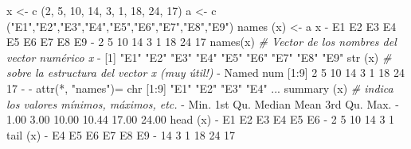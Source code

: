 \documentclass[
]{book}
\newenvironment{Shaded}{\begin{snugshade}}{\end{snugshade}}
\newcommand{\CommentTok}[1]{\textcolor[rgb]{0.56,0.35,0.01}{\textit{#1}}}
\newcommand{\DecValTok}[1]{\textcolor[rgb]{0.00,0.00,0.81}{#1}}
\newcommand{\FloatTok}[1]{\textcolor[rgb]{0.00,0.00,0.81}{#1}}
\newcommand{\FunctionTok}[1]{\textcolor[rgb]{0.00,0.00,0.00}{#1}}
\newcommand{\NormalTok}[1]{#1}
\newcommand{\OtherTok}[1]{\textcolor[rgb]{0.56,0.35,0.01}{#1}}
\newcommand{\SpecialCharTok}[1]{\textcolor[rgb]{0.00,0.00,0.00}{#1}}
\newcommand{\StringTok}[1]{\textcolor[rgb]{0.31,0.60,0.02}{#1}}
\begin{document}
\begin{Shaded}
\begin{Highlighting}[]
\NormalTok{x }\OtherTok{\textless{}{-}} \FunctionTok{c}\NormalTok{ (}\DecValTok{2}\NormalTok{, }\DecValTok{5}\NormalTok{, }\DecValTok{10}\NormalTok{, }\DecValTok{14}\NormalTok{, }\DecValTok{3}\NormalTok{, }\DecValTok{1}\NormalTok{, }\DecValTok{18}\NormalTok{, }\DecValTok{24}\NormalTok{, }\DecValTok{17}\NormalTok{)}
\NormalTok{a }\OtherTok{\textless{}{-}} \FunctionTok{c}\NormalTok{ (}\StringTok{"E1"}\NormalTok{,}\StringTok{"E2"}\NormalTok{,}\StringTok{"E3"}\NormalTok{,}\StringTok{"E4"}\NormalTok{,}\StringTok{"E5"}\NormalTok{,}\StringTok{"E6"}\NormalTok{,}\StringTok{"E7"}\NormalTok{,}\StringTok{"E8"}\NormalTok{,}\StringTok{"E9"}\NormalTok{)}
\FunctionTok{names}\NormalTok{ (x) }\OtherTok{\textless{}{-}}\NormalTok{ a}
\NormalTok{x}
\SpecialCharTok{{-}}\NormalTok{ E1 E2 E3 E4 E5 E6 E7 E8 E9 }
\SpecialCharTok{{-}}  \DecValTok{2}  \DecValTok{5} \DecValTok{10} \DecValTok{14}  \DecValTok{3}  \DecValTok{1} \DecValTok{18} \DecValTok{24} \DecValTok{17}
\FunctionTok{names}\NormalTok{(x) }\CommentTok{\# Vector de los nombres del vector numérico x }
\SpecialCharTok{{-}}\NormalTok{ [}\DecValTok{1}\NormalTok{] }\StringTok{"E1"} \StringTok{"E2"} \StringTok{"E3"} \StringTok{"E4"} \StringTok{"E5"} \StringTok{"E6"} \StringTok{"E7"} \StringTok{"E8"} \StringTok{"E9"}
\FunctionTok{str}\NormalTok{ (x) }\CommentTok{\# sobre la estructura del vector x (muy útil!)}
\SpecialCharTok{{-}}\NormalTok{  Named num [}\DecValTok{1}\SpecialCharTok{:}\DecValTok{9}\NormalTok{] }\DecValTok{2} \DecValTok{5} \DecValTok{10} \DecValTok{14} \DecValTok{3} \DecValTok{1} \DecValTok{18} \DecValTok{24} \DecValTok{17}
\SpecialCharTok{{-}}  \SpecialCharTok{{-}} \FunctionTok{attr}\NormalTok{(}\SpecialCharTok{*}\NormalTok{, }\StringTok{"names"}\NormalTok{)}\OtherTok{=}\NormalTok{ chr [}\DecValTok{1}\SpecialCharTok{:}\DecValTok{9}\NormalTok{] }\StringTok{"E1"} \StringTok{"E2"} \StringTok{"E3"} \StringTok{"E4"}\NormalTok{ ...}
\FunctionTok{summary}\NormalTok{ (x) }\CommentTok{\# indica los valores mínimos, máximos, etc.}
\SpecialCharTok{{-}}\NormalTok{    Min. 1st Qu.  Median    Mean 3rd Qu.    Max. }
\SpecialCharTok{{-}}    \FloatTok{1.00}    \FloatTok{3.00}   \FloatTok{10.00}   \FloatTok{10.44}   \FloatTok{17.00}   \FloatTok{24.00}
\FunctionTok{head}\NormalTok{ (x)}
\SpecialCharTok{{-}}\NormalTok{ E1 E2 E3 E4 E5 E6 }
\SpecialCharTok{{-}}  \DecValTok{2}  \DecValTok{5} \DecValTok{10} \DecValTok{14}  \DecValTok{3}  \DecValTok{1}
\FunctionTok{tail}\NormalTok{ (x)}
\SpecialCharTok{{-}}\NormalTok{ E4 E5 E6 E7 E8 E9 }
\SpecialCharTok{{-}} \DecValTok{14}  \DecValTok{3}  \DecValTok{1} \DecValTok{18} \DecValTok{24} \DecValTok{17}
\end{Highlighting}
\end{Shaded}
\end{document}

